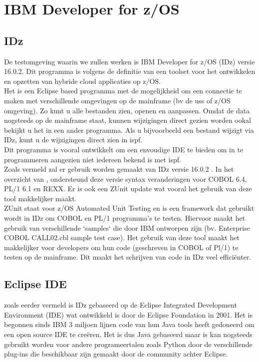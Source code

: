\section{IBM Developer for z/OS}
\label{sec:IBM Developer for z/OS (IDz)}
\subsection{IDz}
De testomgeving waarin we zullen werken is IBM Developer for z/OS (IDz) versie 16.0.2. Dit programma is volgens de definitie van \textcite{Spohn2023} een toolset voor het ontwikkelen en opzetten van hybride cloud applicaties op z/OS. \\
Het is een Eclipse based programma met de mogelijkheid om een connectie te maken met verschillende omgevingen op de mainframe (bv de \acrshort{uss} of z/OS omgeving). Zo kunt u alle bestanden zien, openen en aanpassen. Omdat de data nogsteeds op de mainframe staat, kunnen wijzigingen direct gezien worden ookal bekijkt u het in een ander programma. Als u bijvoorbeeld een bestand wijzigt via IDz, kunt u de wijzigingen direct zien in \acrshort{ispf}. \\
Dit programma is vooral ontwikkelt om een envoudige IDE te bieden om in te programmeren aangezien niet iedereen bekend is met \acrshort{ispf}. \\

Zoals vermeld zal er gebruik worden gemaakt van IDz versie 16.0.2 . In het overzicht van \textcite{IBM2024}, ondersteund deze versie syntax veranderingen voor COBOL 6.4, PL/1 6.1 en REXX. Er is ook een ZUnit update wat vooral het gebruik van deze tool makkelijker maakt. \\

ZUnit staat voor z/OS Automated Unit Testing en is een framework dat gebruikt wordt in IDz om COBOL en PL/1 programma's te testen. Hiervoor maakt het gebruik van verschillende `samples` die door IBM ontworpen zijn (bv. Enterprise COBOL CALL02.cbl sample test case). Het gebruik van deze tool maakt het makkelijker voor developers om hun code (geschreven in COBOL of Pl/1) te testen op de mainframe. Dit maakt het schrijven van code in IDz veel efficiënter. \autocite{IBM2024a}

\subsection{Eclipse IDE}
zoals eerder vermeld is IDz gebaseerd op de Eclipse Integrated Development Environment (IDE) wat ontwikkeld is door de Eclipse Foundation in 2001. Het is begonnen sinds IBM 3 miljoen lijnen code van hun Java tools heeft gedoneerd om een open source IDE te creëren. Het is dus Java gebaseerd maar is kan nogsteeds gebruikt worden voor andere programeertalen zoals Python door de verschillende plug-ins die beschikbaar zijn gemaakt door de community achter Eclipse. \autocite{Hanna2021} \\

